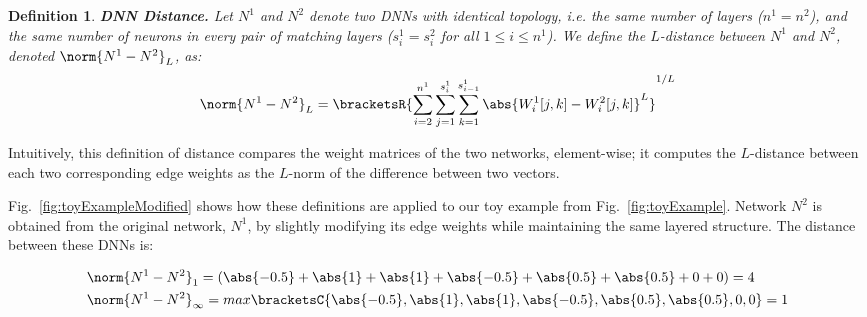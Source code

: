 \documentclass{easychair}
\newtheorem{definition}{Definition}
\begin{document}
\begin{definition}\textbf{DNN Distance.}
  Let $N^1$ and $N^2$ denote two DNNs with identical topology,
  i.e. the same number of layers ($n^1=n^2$), and the same number of
  neurons in every pair of matching layers ($s_i^1=s_i^2$ for all
  $1\leq i \leq n^1$). We define the $L$-distance between $N^1$ and $N^2$,
  denoted $\norm{N^1-N^2}_L$, as:
  \[
    \norm{N^1-N^2}_L =    \bracketsR{\sum_{i=2}^{n^1}\sum_{j=1}^{s_{i}^1}\sum_{k=1}^{s_{i-1}^1}
    \abs{W^1_i[j,k] - W^2_i[j,k]}^L}^{1/L}
  \]
\end{definition}

Intuitively, this definition of distance compares the weight matrices
of the two networks, element-wise; it computes the $L$-distance
between each two corresponding edge weights as the $L$-norm of the difference between two vectors.

Fig.~\ref{fig:toyExampleModified} shows how these definitions are applied
to our toy example from Fig.~\ref{fig:toyExample}. Network $N^2$ is
obtained from the original network, $N^1$, by slightly modifying its
edge weights while maintaining the same layered structure. The distance
between these DNNs is:

\begin{align*}
	&\norm{N^1-N^2}_1=(\abs{-0.5}+\abs{1}+\abs{1}+\abs{-0.5}+\abs{0.5}+\abs{0.5}+0+0)=4\\
	&\norm{N^1-N^2}_\infty=max\bracketsC{\abs{-0.5},\abs{1},\abs{1},\abs{-0.5},\abs{0.5},\abs{0.5},0,0}=1
\end{align*}
\end{document}
